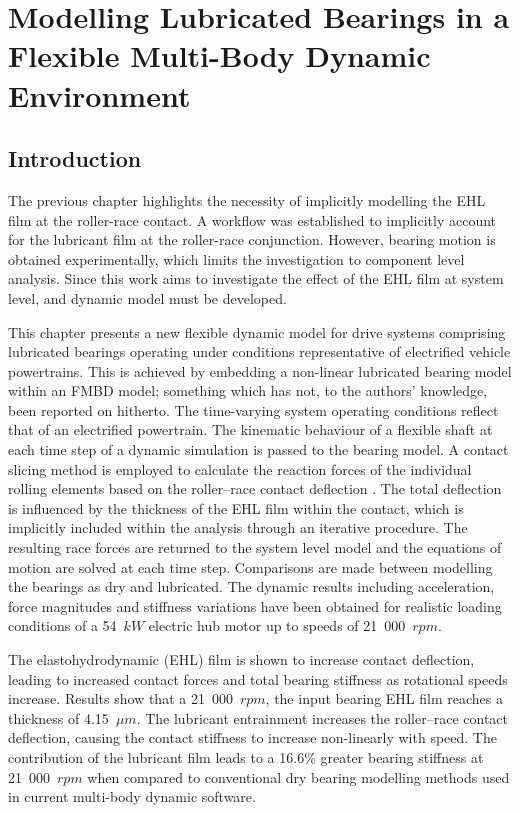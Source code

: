 \chapter{Modelling Lubricated Bearings in a Flexible Multi-Body Dynamic Environment}
\label{Lubricated FMBD}

\section{Introduction}
The previous chapter highlights the necessity of implicitly modelling the EHL film at the roller-race contact. A workflow was established to implicitly account for the lubricant film at the roller-race conjunction. However, bearing motion is obtained experimentally, which limits the investigation to component level analysis. Since this work aims to investigate the effect of the EHL film at system level, and dynamic model must be developed.

This chapter presents a new flexible dynamic model for drive systems comprising lubricated bearings operating under conditions representative of electrified vehicle powertrains. This is achieved by embedding a non-linear lubricated bearing model within an FMBD model; something which has not, to the authors’ knowledge, been reported on hitherto. The time-varying system operating conditions reflect that of an electrified powertrain. The kinematic behaviour of a flexible shaft at each time step of a dynamic simulation is passed to the bearing model. A contact slicing method \cite{Andreason1973} is employed to calculate the reaction forces of the individual rolling elements based on the roller–race contact deflection \cite{Lundberg1949}. The total deflection is influenced by the thickness of the EHL film within the contact, which is implicitly included within the analysis through an iterative procedure. The resulting race forces are returned to the system level model and the equations of motion are solved at each time step. Comparisons are made between modelling the bearings as dry and lubricated. The dynamic results including acceleration, force magnitudes and stiffness variations have been obtained for realistic loading conditions of a 54~$kW$ electric hub motor up to speeds of 21~000~$rpm$.

The elastohydrodynamic (EHL) film is shown to increase contact deflection, leading to increased contact forces and total bearing stiffness as rotational speeds increase. Results show that a 21~000~$rpm$, the input bearing EHL film reaches a thickness of 4.15~$\mu m$. The lubricant entrainment increases the roller–race contact deflection, causing the contact stiffness to increase non-linearly with speed. The contribution of the lubricant film leads to a 16.6\% greater bearing stiffness at 21~000~$rpm$ when compared to conventional dry bearing modelling methods used in current multi-body dynamic software.

